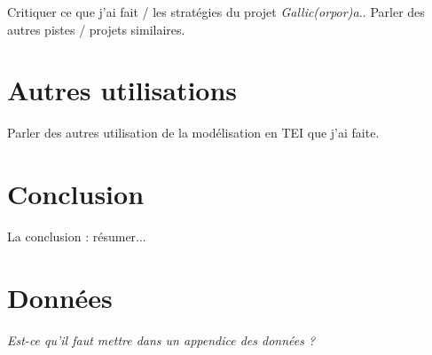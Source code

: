 \documentclass[a4paper,12pt,twoside]{book}
\begin{document}
	Critiquer ce que j'ai fait / les stratégies du projet \textit{Gallic(orpor)a.}. Parler des autres pistes / projets similaires.
	
	\chapter{Autres utilisations}
	
	Parler des autres utilisation de la modélisation en TEI que j'ai faite.
	
	\chapter*{Conclusion}
	
	La conclusion : résumer...
	
	
	\appendix
	\chapter{Données}
	
	\textit{Est-ce qu'il faut mettre dans un appendice des données ?}
	
	\backmatter


	\printglossaries



	\tableofcontents
	
\end{document}
